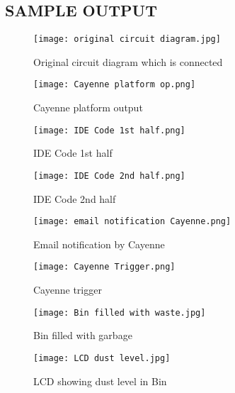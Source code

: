 \documentclass[12pt,letterpaper]{article}
\begin{document}
\subsection{SAMPLE OUTPUT}
    \begin{figure}[htp]
        \centering
        \texttt{[image: original circuit diagram.jpg]}
        \caption{Original circuit diagram which is connected}
        \label{fig:image3}
    \end{figure}
    \begin{figure}[htp]
        \texttt{[image: Cayenne platform op.png]}
        \caption{Cayenne platform output}
        \label{figure: image4}
        \texttt{[image: IDE Code 1st half.png]}
        \caption{IDE Code 1st half}
        \label{figure: image4}
    \end{figure}
    \begin{figure}[htp]
        \texttt{[image: IDE Code 2nd half.png]}
        \caption{IDE Code 2nd half}
        \label{figure: image4}
    \end{figure}
    \begin{figure}[htp]
        \texttt{[image: email notification Cayenne.png]}
        \caption{Email notification by Cayenne}
        \label{figure: image4}
    \end{figure}
    \begin{figure}[htp]
        \texttt{[image: Cayenne Trigger.png]}
        \caption{Cayenne trigger}
        \label{figure: image4}
    \end{figure}
    \begin{figure}[htp]
        \texttt{[image: Bin filled with waste.jpg]}
        \caption{Bin filled with garbage}
        \label{figure: image4}
    \end{figure}
    \begin{figure}[htp]
        \texttt{[image: LCD dust level.jpg]}
        \caption{LCD showing dust level in Bin}
        \label{figure: image4}
    \end{figure}

\newpage
\end{document}
